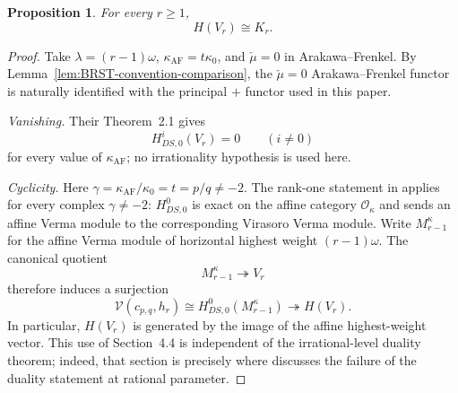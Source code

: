 \documentclass[12pt,leqno]{amsart}
\numberwithin{equation}{section}
\newtheorem{prop}[thm]{Proposition}
\begin{document}
\begin{prop}\label{prop:H-Weyl}
For every $r\geq1$,
\[
 H(V_r)\cong K_r.
\]
\end{prop}

\begin{proof}
Take $\lambda=(r-1)\omega$, $\kappa_{\mathrm{AF}}=t\kappa_0$, and
$\check\mu=0$ in Arakawa--Frenkel.  By Lemma~\ref{lem:BRST-convention-comparison}, the $\check\mu=0$
Arakawa--Frenkel functor is naturally identified with the principal $+$
functor used in this paper.

\emph{Vanishing.}  Their Theorem~2.1 gives
\[
 H^i_{DS,0}(V_r)=0\qquad(i\neq0)
\]
for every value of $\kappa_{\mathrm{AF}}$; no irrationality hypothesis is used here.

\emph{Cyclicity.}  Here
$\gamma=\kappa_{\mathrm{AF}}/\kappa_0=t=p/q\ne-2$.  The rank-one
statement in \cite[Section~4.4]{ArakawaFrenkel} applies for every
complex $\gamma\ne-2$: $H^0_{DS,0}$ is exact on the affine category
$\mathcal O_{\kappa}$ and sends an affine Verma module to the
corresponding Virasoro Verma module.  Write $M^{\kappa}_{r-1}$ for the affine Verma module of horizontal
highest weight $(r-1)\omega$.  The canonical quotient
\[
 M^{\kappa}_{r-1}\twoheadrightarrow V_r
\]
therefore induces a surjection
\[
 \mathcal V(c_{p,q},h_r)
 \cong H^0_{DS,0}(M^{\kappa}_{r-1})
 \twoheadrightarrow H(V_r).
\]
In particular, $H(V_r)$ is generated by the image of the affine
highest-weight vector.  This use of Section~4.4 is independent of the
irrational-level duality theorem; indeed, that section is precisely where
\cite{ArakawaFrenkel} discusses the failure of the duality statement at
rational parameter.


\end{proof}
\end{document}
